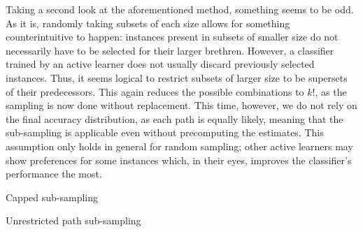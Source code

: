Taking a second look at the aforementioned method, something seems to be odd. As it is, randomly taking subsets of each size allows for something counterintuitive to happen: instances present in subsets of smaller size do not necessarily have to be selected for their larger brethren. However, a classifier trained by an active learner does not usually discard previously selected instances. Thus, it seems logical to restrict subsets of larger size to be supersets of their predecessors. This again reduces the possible combinations to $k!$, as the sampling is now done without replacement. This time, however, we do not rely on the final accuracy distribution, as each path is equally likely, meaning that the sub-sampling is applicable even without precomputing the estimates. This assumption only holds in general for random sampling; other active learners may show preferences for some instances which, in their eyes, improves the classifier's performance the most.

\begin{algorithm}
	\begin{algorithmic}[1]
		\State {}
		\State {}
		\EndFor
		\EndFor
	\end{algorithmic}
	\caption{Capped sub-sampling}
	\label{alg:cappedSubSampling}
\end{algorithm}

\begin{algorithm}
	\begin{algorithmic}[1]
		\State {}
		\State {}
		\EndFor
		\EndFor
	\end{algorithmic}
	\caption{Unrestricted path sub-sampling}
	\label{alg:unresPathSubSampling}
\end{algorithm}

